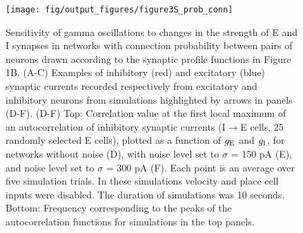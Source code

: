 \documentclass[a4paper,12pt]{article}
\newcommand{\ssc}[3]{\ensuremath{#1_{\text{#2}_{\text{#3}}}}}
\newcommand{\gE      }{\ssc{g}      {\scriptsize{E}}{}}
\newcommand{\gI      }{\ssc{g}      {\scriptsize{I}}{}}
\begin{document}
\clearpage

\begin{figure}[p]
    \internallinenumbers
    \centering
        \texttt{[image: fig/output\_figures/figure3S\_prob\_conn]}
\end{figure}

\clearpage

\begin{figure}[H]
    \internallinenumbers
    \caption{Sensitivity of gamma oscillations to changes in the strength of E
    and I synapses in networks with connection probability between pairs of
    neurons drawn according to the synaptic profile functions in Figure 1B.
    (A-C) Examples of inhibitory (red) and excitatory (blue) synaptic currents
    recorded respectively from excitatory and inhibitory neurons from
    simulations highlighted by arrows in panels (D-F).  (D-F) Top: Correlation
    value at the first local maximum of an autocorrelation of inhibitory
    synaptic currents (I$\rightarrow$E cells, 25 randomly selected E cells),
    plotted as a function of $\gE$ and $\gI$, for networks without noise (D), with
    noise level set to $\sigma$ = 150 pA (E), and noise level set to $\sigma$ =
    300 pA (F). Each point is an average over five simulation trials. In these
    simulations velocity and place cell inputs were disabled.  The duration of
    simulations was 10 seconds.  Bottom: Frequency corresponding to the peaks
    of the autocorrelation functions for simulations in the top panels.}
\end{figure}

\clearpage

%
%
\end{document}
